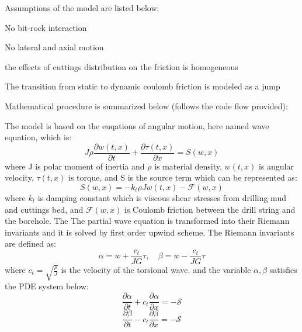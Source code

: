 \noindent Assumptions of the model are listed below:
\begin{bulletedlist}
    \item No bit-rock interaction
    \item No lateral and axial motion
    \item the effects of cuttings distribution on the friction is homogeneous
    \item The transition from static to dynamic coulomb friction is modeled as a jump
\end{bulletedlist}


\noindent Mathematical procedure is summarized below (follows the code flow provided):

The model is based on the euqations of angular motion, here named wave equation, which is:
\begin{equation}\label{AS-motion}
  J\rho\frac{\partial w(t,x)}{\partial t} + \frac{\partial \tau (t,x)}{\partial x} = S(w,x)
\end{equation}
where J is polar moment of inertia and $\rho$ is material density, $w(t,x)$ is angular velocity, $\tau(t,x)$ is torque, and S is the source term which can be represented as:
\begin{equation}\label{AS-sourceterm}
  S(w,x) = -k_t \rho J w(t,x) - \mathcal{F}(w,x)
\end{equation}
where $k_t$ is damping constant which is viscous shear stresses from drilling mud and cuttings bed, and $\mathcal{F}(w,x)$ is Coulomb friction between the drill string and the borehole. 
The 
The partial wave equation is transformed into their Riemann invariants and it is solved by first order upwind scheme. The Riemann invariants are defined as:
\begin{equation}\label{AS-Riemann}
  \alpha = w + \frac{c_t}{JG}\tau, \quad \beta=w-\frac{c_t}{JG}\tau
\end{equation}
where $c_t = \sqrt{\frac{\rho}{J}}$ is the velocity of the torsional wave. and the variable $\alpha, \beta$ satisfies the PDE system below:
\begin{equation}\label{AS-Riemann_alpha}
  \frac{\partial \alpha}{\partial t} + c_t\frac{\partial \alpha}{\partial x} = -\mathcal{S}
\end{equation}
\begin{equation}\label{AS-Riemann_alpha}
  \frac{\partial \beta}{\partial t} - c_t\frac{\partial \beta}{\partial x} = -\mathcal{S}
\end{equation}


